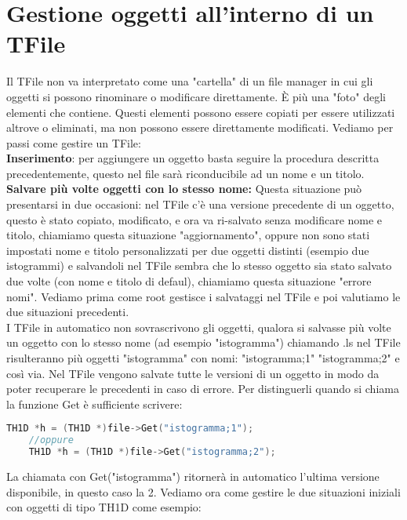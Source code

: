 \section{Gestione oggetti all'interno di un TFile}
Il TFile non va interpretato come una "cartella" di un file manager in cui gli oggetti si possono rinominare o modificare direttamente. È più una "foto" degli elementi che contiene. Questi elementi possono essere copiati per essere utilizzati altrove o eliminati, ma non possono essere direttamente modificati. Vediamo per passi come gestire un TFile:\\
\textbf{Inserimento}: per aggiungere un oggetto basta seguire la procedura descritta precedentemente, questo nel file sarà riconducibile ad un nome e un titolo.\\

\textbf{Salvare più volte oggetti con lo stesso nome:} Questa situazione può presentarsi in due occasioni: nel TFile c'è una versione precedente di un oggetto, questo è stato copiato, modificato, e ora va ri-salvato senza modificare nome e titolo, chiamiamo questa situazione "aggiornamento", oppure non sono stati impostati nome e titolo personalizzati per due oggetti distinti (esempio due istogrammi) e salvandoli nel TFile sembra che lo stesso oggetto sia stato salvato due volte (con nome e titolo di defaul), chiamiamo questa situazione "errore nomi". Vediamo prima come root gestisce i salvataggi nel TFile e poi valutiamo le due situazioni precedenti.\\
I TFile in automatico non sovrascrivono gli oggetti, qualora si salvasse più volte un oggetto con lo stesso nome (ad esempio "istogramma") chiamando .ls nel TFile risulteranno più oggetti "istogramma" con nomi: "istogramma;1" "istogramma;2" e così via. Nel TFile vengono salvate tutte le versioni di un oggetto in modo da poter recuperare le precedenti in caso di errore. Per distinguerli quando si chiama la funzione Get è sufficiente scrivere:
\begin{lstlisting}[language=C++,label={cod1},mathescape=true,breaklines=true]
	TH1D *h = (TH1D *)file->Get("istogramma;1");
	//oppure
	TH1D *h = (TH1D *)file->Get("istogramma;2");
\end{lstlisting}
La chiamata con Get("istogramma") ritornerà in automatico l'ultima versione disponibile, in questo caso la 2. Vediamo ora come gestire le due situazioni iniziali con oggetti di tipo TH1D come esempio:\\
